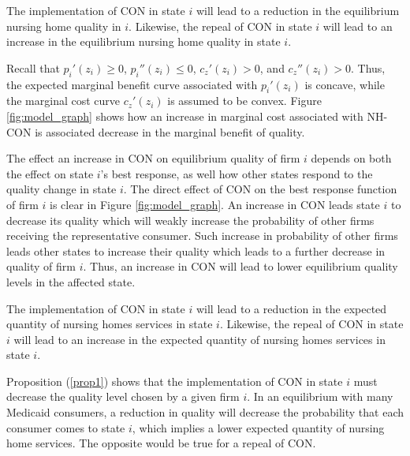\documentclass[../Main.tex]{subfiles}
\begin{document}


\begin{Proposition}\label{prop1}
The implementation of CON in state $i$ will lead to a reduction in the equilibrium nursing home quality in $i$. Likewise, the repeal of CON in state $i$ will lead to an increase in the equilibrium nursing home quality in state $i$. 
\end{Proposition}


Recall that $p_{i}'(z_i)\geq 0$, $p_{i}''(z_i) \leq 0$, $c_z'(z_i)>0$, and $c_z''(z_i)>0$. Thus, the expected marginal benefit curve associated with $p_{i}'(z_i)$ is concave, while the marginal cost curve $c_z'(z_i)$ is assumed to be convex. Figure \ref{fig:model_graph} shows how an increase in marginal cost associated with NH-CON is associated decrease in the marginal benefit of quality. 

The effect an increase in CON on equilibrium quality of firm $i$ depends on both the effect on state $i$'s best response, as well how other states respond to the quality change in state $i$. The direct effect of CON on the best response function of firm $i$ is clear in Figure \ref{fig:model_graph}. An increase in CON leads state $i$ to decrease its quality which will weakly increase the probability of other firms receiving the representative consumer. Such increase in probability of other firms leads other states to increase their quality which leads to a further decrease in quality of firm $i$. Thus, an increase in CON will lead to lower equilibrium quality levels in the affected state. 


\begin{Proposition}\label{prop2}
The implementation of CON in state $i$ will lead to a reduction in the expected quantity of nursing homes services in state $i$. Likewise, the repeal of CON in state $i$ will lead to an increase in the expected quantity of nursing homes services in state $i$. 
\end{Proposition}

Proposition (\ref{prop1}) shows that the implementation of CON in state $i$ must decrease the quality level chosen by a given firm $i$. In an equilibrium with many Medicaid consumers, a reduction in quality will decrease the probability that each consumer comes to state $i$, which implies a lower expected quantity of nursing home services. The opposite would be true for a repeal of CON. 
\end{document}

